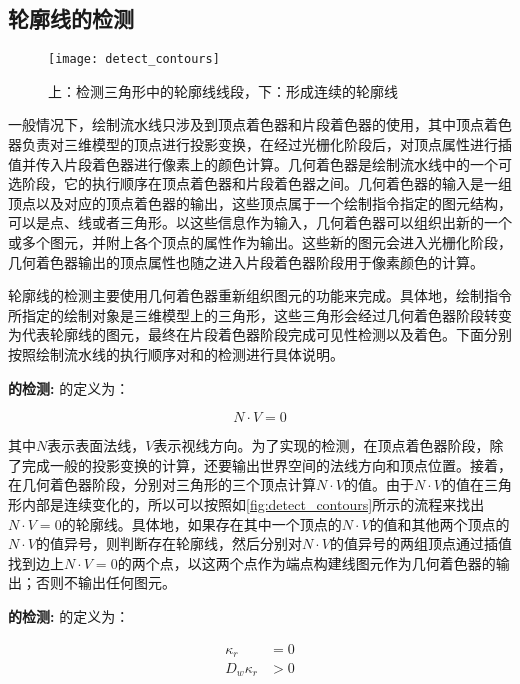 \subsection{轮廓线的检测}

\begin{figure}[!t]
    \centering
    \texttt{[image: detect\_contours]}
    \caption{\label{fig:detect_contours}
    上：检测三角形中的轮廓线线段，下：形成连续的轮廓线}
\end{figure}

一般情况下，绘制流水线只涉及到顶点着色器和片段着色器的使用，其中顶点着色器负责对三维模型的顶点进行投影变换，在经过光栅化阶段后，对顶点属性进行插值并传入片段着色器进行像素上的颜色计算。几何着色器是绘制流水线中的一个可选阶段，它的执行顺序在顶点着色器和片段着色器之间。几何着色器的输入是一组顶点以及对应的顶点着色器的输出，这些顶点属于一个绘制指令指定的图元结构，可以是点、线或者三角形。以这些信息作为输入，几何着色器可以组织出新的一个或多个图元，并附上各个顶点的属性作为输出。这些新的图元会进入光栅化阶段，几何着色器输出的顶点属性也随之进入片段着色器阶段用于像素颜色的计算。

轮廓线的检测主要使用几何着色器重新组织图元的功能来完成。具体地，绘制指令所指定的绘制对象是三维模型上的三角形，这些三角形会经过几何着色器阶段转变为代表轮廓线的图元，最终在片段着色器阶段完成可见性检测以及着色。下面分别按照绘制流水线的执行顺序对\con{}和\scon{}的检测进行具体说明。

\textbf{\con{}的检测:} \con{}的定义为：

\begin{equation}
    N\cdot{V} = 0
\end{equation}

其中$N$表示表面法线，$V$表示视线方向。为了实现\con{}的检测，在顶点着色器阶段，除了完成一般的投影变换的计算，还要输出世界空间的法线方向和顶点位置。接着，在几何着色器阶段，分别对三角形的三个顶点计算$N\cdot{V}$的值。由于$N\cdot{V}$的值在三角形内部是连续变化的，所以可以按照如\autoref{fig:detect_contours}所示的流程来找出$N\cdot{V} = 0$的轮廓线。具体地，如果存在其中一个顶点的$N\cdot{V}$的值和其他两个顶点的$N\cdot{V}$的值异号，则判断存在轮廓线，然后分别对$N\cdot{V}$的值异号的两组顶点通过插值找到边上$N\cdot{V} = 0$的两个点，以这两个点作为端点构建线图元作为几何着色器的输出；否则不输出任何图元。

\textbf{\scon{}的检测:} \scon{}的定义为：

\begin{align}
  \kappa_r &= 0 \label{eq:Kr0} \\
  D_w\kappa_r &> 0 \label{eq:DwKr0} 
\end{align}

